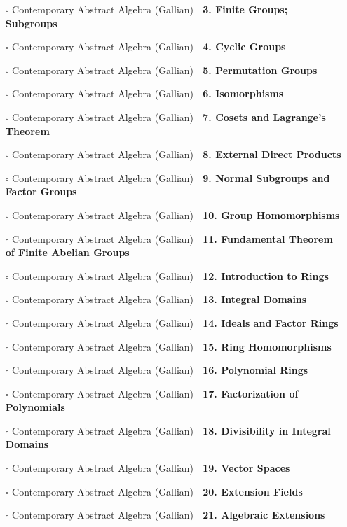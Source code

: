 \documentclass[a4, landscape, 12pt]{article}
\newcommand{\checkbox}{$\square$}%
\begin{document}
\begin{itemize}
\item [\checkbox] Contemporary Abstract Algebra (Gallian)  | \textbf{3. Finite Groups; Subgroups
}
\item [\checkbox] Contemporary Abstract Algebra (Gallian)  | \textbf{4. Cyclic Groups
}
\item [\checkbox] Contemporary Abstract Algebra (Gallian)  | \textbf{5. Permutation Groups
}
\item [\checkbox] Contemporary Abstract Algebra (Gallian)  | \textbf{6. Isomorphisms 
}
\item [\checkbox] Contemporary Abstract Algebra (Gallian)  | \textbf{7. Cosets and Lagrange’s Theorem
}
\item [\checkbox] Contemporary Abstract Algebra (Gallian)  | \textbf{8. External Direct Products
}
\item [\checkbox] Contemporary Abstract Algebra (Gallian)  | \textbf{9. Normal Subgroups and Factor Groups
}
\item [\checkbox] Contemporary Abstract Algebra (Gallian)  | \textbf{10. Group Homomorphisms
}
\item [\checkbox] Contemporary Abstract Algebra (Gallian)  | \textbf{11. Fundamental Theorem of Finite Abelian Groups
}
\item [\checkbox] Contemporary Abstract Algebra (Gallian)  | \textbf{12. Introduction to Rings
}
\item [\checkbox] Contemporary Abstract Algebra (Gallian)  | \textbf{13. Integral Domains
}
\item [\checkbox] Contemporary Abstract Algebra (Gallian)  | \textbf{14. Ideals and Factor Rings
}
\item [\checkbox] Contemporary Abstract Algebra (Gallian)  | \textbf{15. Ring Homomorphisms
}
\item [\checkbox] Contemporary Abstract Algebra (Gallian)  | \textbf{16. Polynomial Rings
}
\item [\checkbox] Contemporary Abstract Algebra (Gallian)  | \textbf{17. Factorization of Polynomials
}
\item [\checkbox] Contemporary Abstract Algebra (Gallian)  | \textbf{18. Divisibility in Integral Domains
}
\item [\checkbox] Contemporary Abstract Algebra (Gallian)  | \textbf{19. Vector Spaces
}
\item [\checkbox] Contemporary Abstract Algebra (Gallian)  | \textbf{20. Extension Fields
}
\item [\checkbox] Contemporary Abstract Algebra (Gallian)  | \textbf{21. Algebraic Extensions
}
\end{itemize}
\end{document}
